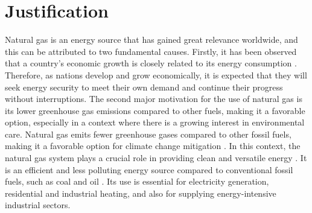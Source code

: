 

\section{Justification}

    Natural gas is an energy source that has gained great relevance worldwide, and this can be attributed to two fundamental causes. Firstly, it has been observed that a country's economic growth is closely related to its energy consumption \cite{Alam_M}. Therefore, as nations develop and grow economically, it is expected that they will seek energy security to meet their own demand and continue their progress without interruptions. The second major motivation for the use of natural gas is its lower greenhouse gas emissions compared to other fuels, making it a favorable option, especially in a context where there is a growing interest in environmental care. Natural gas emits fewer greenhouse gases compared to other fossil fuels, making it a favorable option for climate change mitigation \cite{china_natural_gas}. In this context, the natural gas system plays a crucial role in providing clean and versatile energy \cite{Yin_Wen_Wu_Han_Mukhtar_Gong_2022}. It is an efficient and less polluting energy source compared to conventional fossil fuels, such as coal and oil \cite{Aydin_2018}. Its use is essential for electricity generation, residential and industrial heating, and also for supplying energy-intensive industrial sectors.

